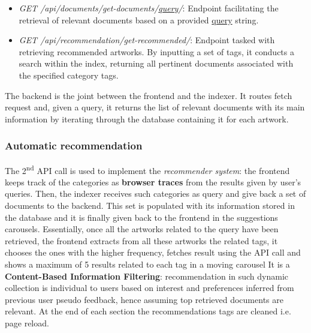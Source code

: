 \documentclass[12pt]{spieman}  %
\begin{document}
\begin{spacing}{1}
    \begin{itemize}
        \item \textit{GET /api/documents/get-documents/\underline{query}/}:
              Endpoint facilitating the retrieval of relevant documents based on a provided \underline{query} string.
        \item \textit{GET /api/recommendation/get-recommended/}:
              Endpoint tasked with retrieving recommended artworks.
              By inputting a set of tags, it conducts a search within the index,
              returning all pertinent documents associated with the specified category tags.
    \end{itemize}

    The backend is the joint between the frontend and the indexer.
    It routes fetch request and, given a query, it returns the list of relevant documents with its main information
    by iterating through the database containing it for each artwork.

    \subsubsection{Automatic recommendation}\label{sec:recommender}
    The 2\textsuperscript{nd} API call is used to implement the \textit{recommender system}:
    the frontend keeps track of the categories as \textbf{browser traces} from the results given by user's queries.
    Then, the indexer receives such categories as query and give back a set of documents to the backend.
    This set is populated with its information stored in the database and it is finally given back to the frontend in
    the suggestions carousels.
    Essentially, once all the artworks related to the query have been retrieved,
    the frontend extracts from all these artworks the related tags,
    it chooses the ones with the higher frequency, fetches result using the API call and
    shows a maximum of 5 results related to each tag in a moving carousel
    It is a \textbf{Content-Based Information Filtering}:
    recommendation in such dynamic collection is individual to users based on interest and preferences inferred from
    previous user pseudo feedback, hence assuming top retrieved documents are relevant.
    At the end of each section the recommendations tags are cleaned i.e. page reload.


\end{spacing}
\end{document}
